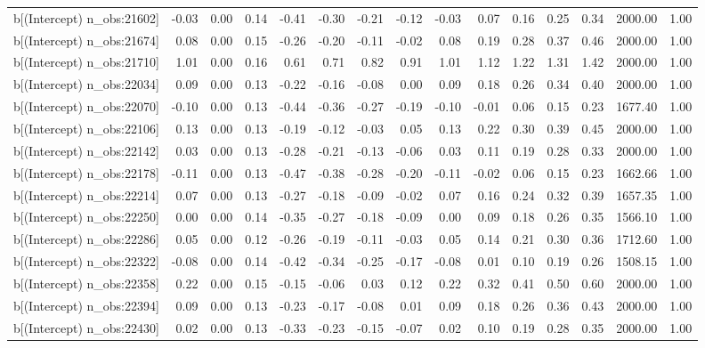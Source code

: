 \begin{table}[ht]
\begin{tabular}{rrrrrrrrrrrrrrr}
  b[(Intercept) n\_obs:21602] & -0.03 & 0.00 & 0.14 & -0.41 & -0.30 & -0.21 & -0.12 & -0.03 & 0.07 & 0.16 & 0.25 & 0.34 & 2000.00 & 1.00 \\ 
  b[(Intercept) n\_obs:21674] & 0.08 & 0.00 & 0.15 & -0.26 & -0.20 & -0.11 & -0.02 & 0.08 & 0.19 & 0.28 & 0.37 & 0.46 & 2000.00 & 1.00 \\ 
  b[(Intercept) n\_obs:21710] & 1.01 & 0.00 & 0.16 & 0.61 & 0.71 & 0.82 & 0.91 & 1.01 & 1.12 & 1.22 & 1.31 & 1.42 & 2000.00 & 1.00 \\ 
  b[(Intercept) n\_obs:22034] & 0.09 & 0.00 & 0.13 & -0.22 & -0.16 & -0.08 & 0.00 & 0.09 & 0.18 & 0.26 & 0.34 & 0.40 & 2000.00 & 1.00 \\ 
  b[(Intercept) n\_obs:22070] & -0.10 & 0.00 & 0.13 & -0.44 & -0.36 & -0.27 & -0.19 & -0.10 & -0.01 & 0.06 & 0.15 & 0.23 & 1677.40 & 1.00 \\ 
  b[(Intercept) n\_obs:22106] & 0.13 & 0.00 & 0.13 & -0.19 & -0.12 & -0.03 & 0.05 & 0.13 & 0.22 & 0.30 & 0.39 & 0.45 & 2000.00 & 1.00 \\ 
  b[(Intercept) n\_obs:22142] & 0.03 & 0.00 & 0.13 & -0.28 & -0.21 & -0.13 & -0.06 & 0.03 & 0.11 & 0.19 & 0.28 & 0.33 & 2000.00 & 1.00 \\ 
  b[(Intercept) n\_obs:22178] & -0.11 & 0.00 & 0.13 & -0.47 & -0.38 & -0.28 & -0.20 & -0.11 & -0.02 & 0.06 & 0.15 & 0.23 & 1662.66 & 1.00 \\ 
  b[(Intercept) n\_obs:22214] & 0.07 & 0.00 & 0.13 & -0.27 & -0.18 & -0.09 & -0.02 & 0.07 & 0.16 & 0.24 & 0.32 & 0.39 & 1657.35 & 1.00 \\ 
  b[(Intercept) n\_obs:22250] & 0.00 & 0.00 & 0.14 & -0.35 & -0.27 & -0.18 & -0.09 & 0.00 & 0.09 & 0.18 & 0.26 & 0.35 & 1566.10 & 1.00 \\ 
  b[(Intercept) n\_obs:22286] & 0.05 & 0.00 & 0.12 & -0.26 & -0.19 & -0.11 & -0.03 & 0.05 & 0.14 & 0.21 & 0.30 & 0.36 & 1712.60 & 1.00 \\ 
  b[(Intercept) n\_obs:22322] & -0.08 & 0.00 & 0.14 & -0.42 & -0.34 & -0.25 & -0.17 & -0.08 & 0.01 & 0.10 & 0.19 & 0.26 & 1508.15 & 1.00 \\ 
  b[(Intercept) n\_obs:22358] & 0.22 & 0.00 & 0.15 & -0.15 & -0.06 & 0.03 & 0.12 & 0.22 & 0.32 & 0.41 & 0.50 & 0.60 & 2000.00 & 1.00 \\ 
  b[(Intercept) n\_obs:22394] & 0.09 & 0.00 & 0.13 & -0.23 & -0.17 & -0.08 & 0.01 & 0.09 & 0.18 & 0.26 & 0.36 & 0.43 & 2000.00 & 1.00 \\ 
  b[(Intercept) n\_obs:22430] & 0.02 & 0.00 & 0.13 & -0.33 & -0.23 & -0.15 & -0.07 & 0.02 & 0.10 & 0.19 & 0.28 & 0.35 & 2000.00 & 1.00 \\ 

\end{tabular}
\end{table}
